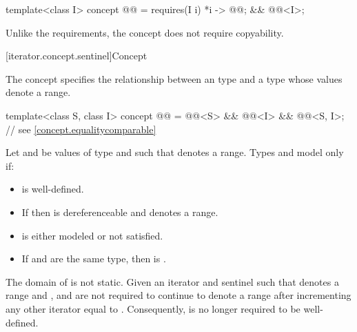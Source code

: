 \begin{codeblock}
template<class I>
  concept @@ =
    requires(I i) {
      { *i } -> @@;
    } &&
    @@<I>;
\end{codeblock}

\pnum
\begin{note}
Unlike the  requirements,
the  concept does not require copyability.
\end{note}

[iterator.concept.sentinel]{Concept }

\pnum
The  concept specifies the relationship
between an  type and a  type
whose values denote a range.

\begin{itemdecl}
template<class S, class I>
  concept @@ =
    @@<S> &&
    @@<I> &&
    @@<S, I>;      // see \ref{concept.equalitycomparable}
\end{itemdecl}

\begin{itemdescr}
\pnum
Let  and  be values of type  and
 such that  denotes a range. Types
 and  model  only if:
\begin{itemize}
\item {} is well-defined.

\item If  then  is dereferenceable and
       denotes a range.

\item {} is either modeled or not satisfied.

\item If  and  are the same type, then
       is .
\end{itemize}
\end{itemdescr}

\pnum
The domain of \tcode{==} is not static.
Given an iterator  and sentinel  such that 
denotes a range and ,  and  are not required to
continue to denote a range after incrementing any other iterator equal
to . Consequently,  is no longer required to be
well-defined.

